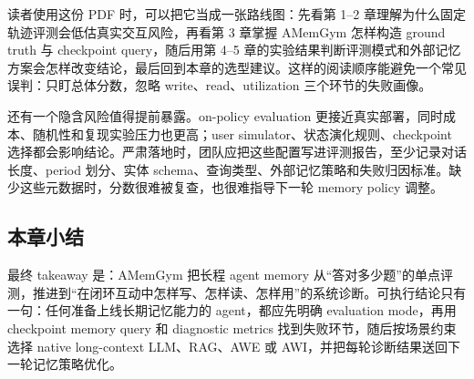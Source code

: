 读者使用这份 PDF 时，可以把它当成一张路线图：先看第 1--2 章理解为什么固定轨迹评测会低估真实交互风险，再看第 3 章掌握 AMemGym 怎样构造 ground truth 与 checkpoint query，随后用第 4--5 章的实验结果判断评测模式和外部记忆方案会怎样改变结论，最后回到本章的选型建议。这样的阅读顺序能避免一个常见误判：只盯总体分数，忽略 write、read、utilization 三个环节的失败画像。

还有一个隐含风险值得提前暴露。on-policy evaluation 更接近真实部署，同时成本、随机性和复现实验压力也更高；user simulator、状态演化规则、checkpoint 选择都会影响结论。严肃落地时，团队应把这些配置写进评测报告，至少记录对话长度、period 划分、实体 schema、查询类型、外部记忆策略和失败归因标准。缺少这些元数据时，分数很难被复查，也很难指导下一轮 memory policy 调整。

\subsection{本章小结}

最终 takeaway 是：AMemGym 把长程 agent memory 从“答对多少题”的单点评测，推进到“在闭环互动中怎样写、怎样读、怎样用”的系统诊断。可执行结论只有一句：任何准备上线长期记忆能力的 agent，都应先明确 evaluation mode，再用 checkpoint memory query 和 diagnostic metrics 找到失败环节，随后按场景约束选择 native long-context LLM、RAG、AWE 或 AWI，并把每轮诊断结果送回下一轮记忆策略优化。
